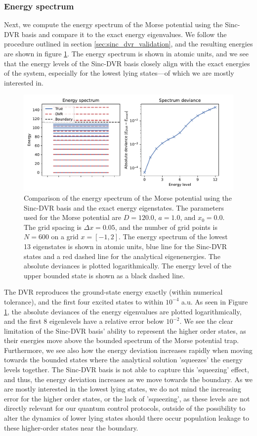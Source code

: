 \documentclass{subfiles}
\begin{document}
\subsubsection*{Energy spectrum}
Next, we compute the energy spectrum of the Morse potential using the Sinc-DVR basis and compare it to the exact energy eigenvalues. We follow the procedure outlined in section \ref{sec:sinc_dvr_validation}, and the resulting energies are shown in figure \ref{fig:dvr_validation}. The energy spectrum is shown in atomic units, and we see that the energy levels of the Sinc-DVR basis closely align with the exact energies of the system, especially for the lowest lying states—of which we are mostly interested in. 
\begin{figure}[h!]
    \centering
    \includegraphics[width=\textwidth]{figs/dvr_validation.pdf}
    \caption{Comparison of the energy spectrum of the Morse potential using the Sinc-DVR basis and the exact energy eigenstates. The parameters used for the Morse potential are $D = 120.0$, $a = 1.0$, and $x_0 = 0.0$. The grid spacing is $\Delta x = 0.05$, and the number of grid points is $N = 600$ on a grid $x=[-1, 2]$. The energy spectrum of the lowest 13 eigenstates is shown in atomic units, blue line for the Sinc-DVR states and a red dashed line for the analytical eigenenergies. The absolute deviances is plotted logarithmically. The energy level of the upper bounded state is shown as a black dashed line.}
    \label{fig:dvr_validation}
\end{figure}

The DVR reproduces the ground-state energy exactly (within numerical tolerance), and the first four excited states to within $10^{-4}$ a.u. As seen in Figure \ref{fig:dvr_validation}, the absolute deviances of the energy eigenvalues are plotted logarithmically, and the first 8 eigenlevels have a relative error below $10^{-2}$. We see the clear limitation of the Sinc-DVR basis' ability to represent the higher order states, as their energies move above the bounded spectrum of the Morse potential trap. Furthermore, we see also how the energy deviation increases rapidly when moving towards the bounded states where the analytical solution 'squeezes' the energy levels together. The Sinc-DVR basis is not able to capture this 'squeezing' effect, and thus, the energy deviation increases as we move towards the boundary. 
As we are mostly interested in the lowest lying states, we do not mind the increasing error for the higher order states, or the lack of 'squeezing', as these levels are not directly relevant for our quantum control protocols, outside of the possibility to alter the dynamics of lower lying states should there occur population leakage to these higher-order states near the boundary.
\end{document}
